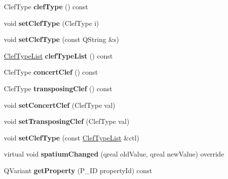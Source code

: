 \begin{DoxyCompactItemize}
Clef\+Type {\bfseries clef\+Type} () const
\item 
\mbox{\label{class_ms_1_1_clef_a2eecb12827da565064dae00af74efa16}} 
void {\bfseries set\+Clef\+Type} (Clef\+Type i)
\item 
\mbox{\label{class_ms_1_1_clef_a05210958a69449b55271c13496f9fca6}} 
void {\bfseries set\+Clef\+Type} (const Q\+String \&s)
\item 
\mbox{\label{class_ms_1_1_clef_a671c06e687c6859c09da2135d1c849f5}} 
\hyperlink{struct_ms_1_1_clef_type_list}{Clef\+Type\+List} {\bfseries clef\+Type\+List} () const
\item 
\mbox{\label{class_ms_1_1_clef_a653f6476f5cf0fe5c8400f4b05bd1541}} 
Clef\+Type {\bfseries concert\+Clef} () const
\item 
\mbox{\label{class_ms_1_1_clef_a7406081984265742461ddcc3ee0757f1}} 
Clef\+Type {\bfseries transposing\+Clef} () const
\item 
\mbox{\label{class_ms_1_1_clef_a163652155a0f0187d6de3f038f67792f}} 
void {\bfseries set\+Concert\+Clef} (Clef\+Type val)
\item 
\mbox{\label{class_ms_1_1_clef_a5fe077e2b27aa3281e0b6d653d808625}} 
void {\bfseries set\+Transposing\+Clef} (Clef\+Type val)
\item 
\mbox{\label{class_ms_1_1_clef_ae0dc13502c2dd1b92e365e3bc9b40be6}} 
void {\bfseries set\+Clef\+Type} (const \hyperlink{struct_ms_1_1_clef_type_list}{Clef\+Type\+List} \&ctl)
\item 
\mbox{\label{class_ms_1_1_clef_a73c0e8a424b9c0477743ca0c83801157}} 
virtual void {\bfseries spatium\+Changed} (qreal old\+Value, qreal new\+Value) override
\item 
\mbox{\label{class_ms_1_1_clef_a5da11dc377c26444e6b61ac7d48c9566}} 
Q\+Variant {\bfseries get\+Property} (P\+\_\+\+ID property\+Id) const
\item 
\mbox{\label{class_ms_1_1_clef_a1d852efb9d6ad9269d7783588c548f2c}} 

\end{DoxyCompactItemize}
